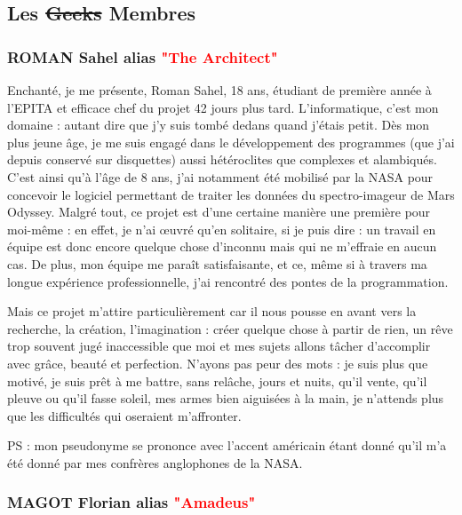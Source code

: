 \documentclass{article}
\begin{document}
\newpage
\subsection{Les \st{Geeks} Membres}
\subsubsection{ROMAN Sahel alias \textcolor{red}{"The Architect"}}

\par
Enchanté, je me présente, Roman Sahel, 18 ans, étudiant de première année à l’EPITA et efficace chef du projet 42 jours plus tard. L’informatique, c’est mon domaine : autant dire que j’y suis tombé dedans quand j’étais petit. Dès mon plus jeune âge, je me suis engagé dans le développement des programmes (que j’ai depuis conservé sur disquettes) aussi hétéroclites que complexes et alambiqués. C’est ainsi qu’à l’âge de 8 ans, j’ai notamment été mobilisé par la NASA pour concevoir le logiciel permettant de traiter les données du spectro-imageur de Mars Odyssey.
Malgré tout, ce projet est d’une certaine manière une première pour moi-même : en effet, je n’ai œuvré qu'en solitaire, si je puis dire : un travail en équipe est donc encore quelque chose d’inconnu mais qui ne m’effraie en aucun cas. De plus, mon équipe me paraît satisfaisante, et ce, même si à travers ma longue expérience professionnelle, j’ai rencontré des pontes de la programmation.
\newline

\par
Mais ce projet m’attire particulièrement car il nous pousse en avant vers la recherche, la création, l’imagination : créer quelque chose à partir de rien, un rêve trop souvent jugé inaccessible que moi et mes sujets allons tâcher d’accomplir avec grâce, beauté et perfection. N’ayons pas peur des mots : je suis plus que motivé, je suis prêt à me battre, sans relâche, jours et nuits, qu’il vente, qu’il pleuve ou qu’il fasse soleil, mes armes bien aiguisées à la main, je n’attends plus que les difficultés qui oseraient m’affronter.
\newline

\par
PS : mon pseudonyme se prononce avec l'accent américain étant donné qu’il m’a été donné par mes confrères anglophones de la NASA.
\newline

\subsubsection{MAGOT Florian alias \textcolor{red}{"Amadeus"}}
\end{document}
